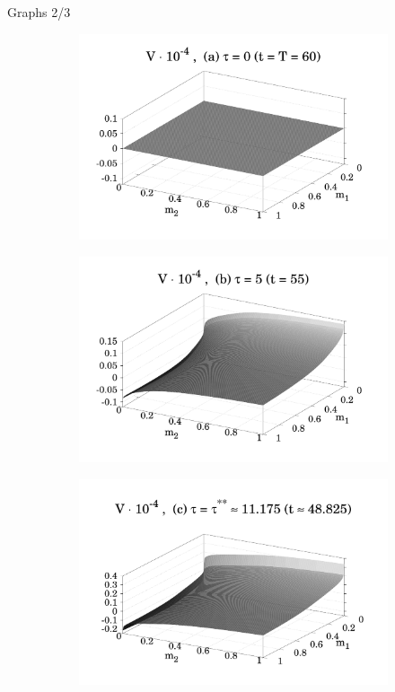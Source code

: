 \documentclass{beamer}
\begin{document}
\begin{frame}{Graphs 2/3}
    \begin{figure}
        \centering
        \begin{subfigure}{.48 \textwidth}
            \includegraphics[width = \textwidth]{figures/Figure_4a.pdf}
            \label{fig_4_a}
        \end{subfigure}
        \begin{subfigure}{.48 \textwidth}
            \includegraphics[width = \textwidth]{figures/Figure_4b_1.pdf}
            \label{fig_4_b}
        \end{subfigure}
        \begin{subfigure}{.48 \textwidth}
            \includegraphics[width = \textwidth]{figures/Figure_4c_1.pdf}

\end{subfigure}
\end{figure}
\end{frame}
\end{document}
